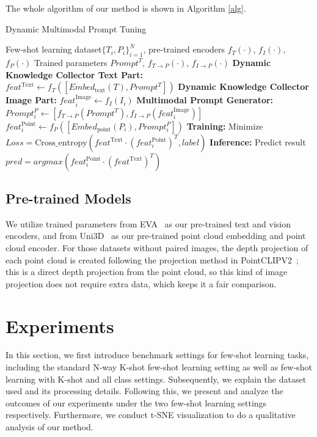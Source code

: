 \documentclass{ecai}
\begin{document}
The whole algorithm of our method is shown in Algorithm \ref{alg}.
\begin{algorithm}
\caption{Dynamic Multimodal Prompt Tuning}
\label{alg}
\begin{algorithmic}[1]
\Require Few-shot learning dataset$\{T_i, P_i\}_{i=1}^N$, 
pre-trained encoders $f_T(\cdot)$, $f_I(\cdot)$, $f_P(\cdot)$
\Ensure Trained parameters $Prompt^T$, $f_{T \rightarrow P}(\cdot)$, $f_{I \rightarrow P}(\cdot)$
\State \textbf{Dynamic Knowledge Collector Text Part:} 
    \State $feat^{\text{Text}} \gets f_T([Embed_{\text{text}}(T), Prompt^T])$
\State \textbf{Dynamic Knowledge Collector Image Part:}
    \State$feat_i^{\text{Image}} \gets f_I(I_i)$
\State \textbf{Multimodal Prompt Generator:} 
    \State $Prompt^P_i \gets [f_{T \rightarrow P}(Prompt^T), f_{I \rightarrow P}(feat_i^{\text{Image}})]$
    \State $feat_i^{\text{Point}} \gets f_P([Embed_{\text{point}}(P_i), Prompt^P_i])$
\State \textbf{Training:} 
\State Minimize $Loss = \text{Cross\_entropy}(feat^{\text{Text}} \cdot (feat_i^{\text{Point}})^T, label)$
\State \textbf{Inference:} 
\State Predict result $pred = argmax(feat_i^{\text{Point}} \cdot (feat^{\text{Text}})^T)$
\end{algorithmic}
\end{algorithm}
\subsection{Pre-trained Models}
We utilize trained parameters from EVA~\cite{fang2023eva} as our pre-trained text and vision encoders, and from Uni3D~\cite{zhang2023uni3d} as our pre-trained point cloud embedding and point cloud encoder. For those datasets without paired images, the depth projection of each point cloud is created following the projection method in PointCLIPV2~\cite{zhu2023pointclip}; this is a direct depth projection from the point cloud, so this kind of image projection does not require extra data, which keeps it a fair comparison. 

\section{Experiments}\label{experiments}
In this section, we first introduce benchmark settings for few-shot learning tasks, including the standard N-way K-shot few-shot learning setting as well as few-shot learning with K-shot and all class settings. Subsequently, we explain the dataset used and its processing details. Following this, we present and analyze the outcomes of our experiments under the two few-shot learning settings respectively. Furthermore, we conduct t-SNE visualization to do a qualitative analysis of our method.
\end{document}
